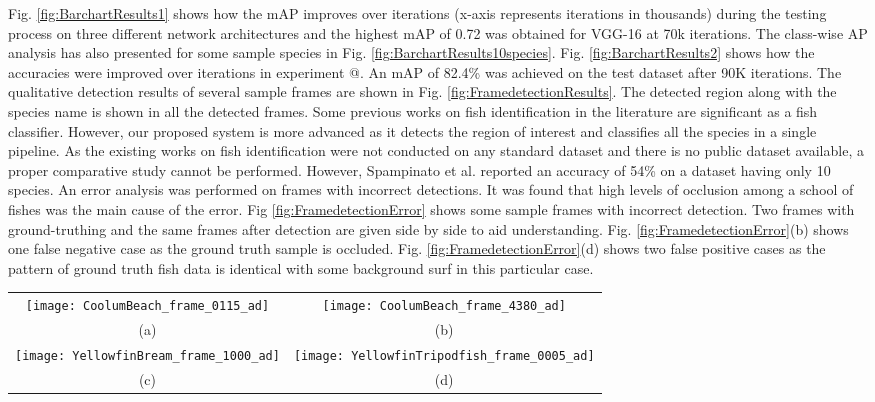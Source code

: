 \documentclass[conference]{IEEEtran}       %
\makeatletter
\newcommand*{\rom}[1]{\expandafter\@slowromancap\romannumeral #1@}
\makeatother
\begin{document}
Fig. \ref{fig:BarchartResults1} shows how the mAP improves over iterations (x-axis represents iterations in thousands) during the testing process on three different network architectures and the highest mAP of 0.72 was obtained for VGG-16 at 70k iterations. The class-wise AP analysis has also presented for some sample species in Fig. \ref{fig:BarchartResults10species}.  Fig. \ref{fig:BarchartResults2} shows how the accuracies were improved over iterations in experiment \rom{2}. An mAP of 82.4\% was achieved on the test dataset after 90K iterations. 
The qualitative detection results of several sample frames are shown in Fig. \ref{fig:FramedetectionResults}. The detected region along with the species name is shown in all the detected frames. Some previous works on fish identification in the literature are significant as a fish classifier. However, our proposed system is more advanced as it detects the region of interest and classifies all the species in a single pipeline. As the existing works on fish identification were not conducted on any standard dataset and there is no public dataset available, a proper comparative study cannot be performed. However, Spampinato et al. \cite{Spampinato2016} reported an accuracy of 54\% on a dataset having only 10 species. 
An error analysis was performed on frames with incorrect detections. It was found that high levels of occlusion among a school of fishes was the main cause of the error.  Fig \ref{fig:FramedetectionError} shows some sample frames with incorrect detection. Two frames with ground-truthing and the same frames after detection are given side by side to aid understanding. Fig. \ref{fig:FramedetectionError}(b) shows one false negative case as the ground truth sample is occluded. Fig. \ref{fig:FramedetectionError}(d) shows two false positive cases as the pattern of ground truth fish data is identical with some background surf in this particular case.
\begin{figure*}[!htb]
   \centering
   \begin{tabular}{cc}
        \texttt{[image: CoolumBeach\_frame\_0115\_ad]}&
        \texttt{[image: CoolumBeach\_frame\_4380\_ad]}\\
        (a) & (b)\\
        \texttt{[image: YellowfinBream\_frame\_1000\_ad]}&
        \texttt{[image: YellowfinTripodfish\_frame\_0005\_ad]}\\
           (c) & (d)\\
   \end{tabular}  \vspace{-2ex}
   \caption{Qualitative results on sample frames extracted from the underwater videos of  surf across southeast Queensland. Detected species are marked with a coloured bounding boxes.}
   \label{fig:FramedetectionResults}
   \vspace{-2ex}
\end{figure*}
\end{document}

